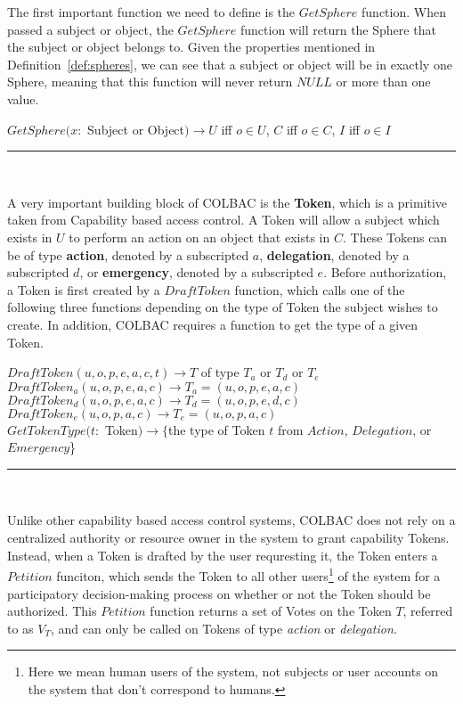 \noindent The first important function we need to define is the $GetSphere$
function. When passed a subject or object, the $GetSphere$ function will return
the Sphere that the subject or object belongs to. Given the properties mentioned
in Definition~\ref{def:spheres}, we can see that a subject or object will be in
exactly one Sphere, meaning that this function will never return $NULL$ or more
than one value.

\begin{definition}[GetSphere]\label{def:getsphere}
$GetSphere(x:$ Subject or Object$) \rightarrow U$ iff $o \in U$, $C$ iff $o \in 
C$, $I$ iff $o \in I$\\
\hrule \mbox{}\\
\end{definition}

\noindent A very important building block of COLBAC is the \textbf{Token}, which
is a primitive taken from Capability based access control. A Token will allow a
subject which exists in $U$ to perform an action on an object that exists in
$C$. These Tokens can be of type \textbf{action}, denoted by a subscripted $a$,
\textbf{delegation}, denoted by a subscripted $d$, or \textbf{emergency},
denoted by a subscripted $e$. Before authorization, a Token is first created by
a $DraftToken$ function, which calls one of the following three functions
depending on the type of Token the subject wishes to create. In addition, COLBAC
requires a function to get the type of a given Token.
\begin{definition}\label{def:Tokens}
$DraftToken(u,o,p,e,a,c,t) \rightarrow T$ of type $T_{a}$ or $T_{d}$ or 
$T_{e}$\\
$DraftToken_{a}(u,o,p,e,a,c) \rightarrow T_{a} = (u,o,p,e,a,c)$\\
$DraftToken_{d}(u,o,p,e,a,c) \rightarrow T_{d} = (u,o,p,e,d,c)$\\
$DraftToken_{e}(u,o,p,a,c) \rightarrow T_{e} = (u,o,p,a,c)$\\
$GetTokenType(t:$ Token$) \rightarrow \{$the type of Token $t$ from $Action$,
$Delegation$, or $Emergency$\}
\hrule \mbox{}\\
\end{definition}

\noindent Unlike other capability based access control systems, COLBAC does not
rely on a centralized authority or resource owner in the system to grant
capability Tokens. Instead, when a Token is drafted by the user requresting it,
the Token enters a $Petition$ funciton, which sends the Token to all other
users\footnote{Here we mean human users of the system, not subjects or user
accounts on the system that don't correspond to humans.} of the system for a
participatory decision-making process on whether or not the Token should be
authorized. This $Petition$ function returns a set of Votes on the Token $T$,
referred to as $V_{T}$, and can only be called on Tokens of type \textit{action}
or \textit{delegation.}

